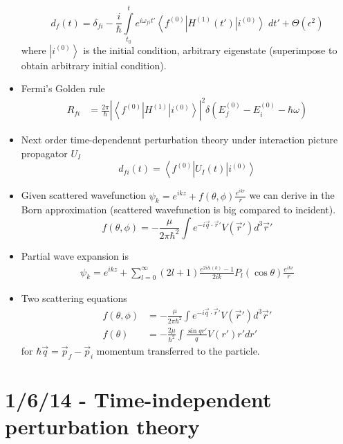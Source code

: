 \documentclass[10pt]{report}
\newcommand{\bra}[1]{\left<#1\right|}
\newcommand{\ket}[1]{\left|#1\right>}
\newcommand{\abs}[1]{\left|#1\right|}
\begin{document}
\begin{itemize}
    \begin{equation}
        d_f(t) = \delta_{fi}-\frac{i}{\hbar}\displaystyle\int\limits_{t_0}^{t}e^{i\omega_{fi}t'}\bra{f^{(0)}}H^{(1)}(t')\ket{i^{(0)}}\;dt' + \Theta(\epsilon^2)
    \end{equation}
    where $\ket{i^{(0)}}$ is the initial condition, arbitrary eigenstate (superimpose to obtain arbitrary initial condition). 
    \item Fermi's Golden rule
    \begin{align}
        R_{fi} &= \frac{2\pi}{\hbar}\abs{\bra{f^{(0)}}H^{(1)}\ket{i^{(0)}}}^2\delta\left( E_f^{(0)} - E_i^{(0)} - \hbar\omega \right)
    \end{align}
    \item Next order time-dependennt perturbation theory under interaction picture propagator $U_I$
        \begin{equation}
            d_{fi}(t) = \bra{f^{(0)}}U_I(t)\ket{i^{(0)}}
        \end{equation}
    \item Given scattered wavefunction $\psi_k = e^{ikz} + f(\theta,\phi)\frac{e^{ikr}}{r}$ we can derive in the Born approximation (scattered wavefunction is big compared to incident).
        \begin{equation}
            f(\theta,\phi) = -\frac{\mu}{2\pi\hbar^2}\int e^{-i\vec{q}\cdot \vec{r}'}V(\vec{r}')d^3\vec{r}'
        \end{equation}
    \item Partial wave expansion is
        \begin{align}
                \psi_k = e^{ikz} + \sum_{l=0}^{\infty}(2l+1)\frac{e^{2i\delta_l(k)} - 1}{2ik}P_l(\cos\theta)\frac{e^{ikr}}{r}
        \end{align}
    \item Two scattering equations
        \begin{align}
                f(\theta,\phi) &= -\frac{\mu}{2\pi\hbar^2}\int e^{-i\vec{q}\cdot \vec{r}'}V(\vec{r}')d^3\vec{r}'\\
                f(\theta)&= -\frac{2\mu}{\hbar^2}\int \frac{\sin qr'}{q}V(r') r' dr'
        \end{align}
        for $\hbar\vec{q} = \vec{p}_f - \vec{p}_i$ momentum transferred to the particle.
\end{itemize}

\chapter{1/6/14 - Time-independent perturbation theory}
\end{document}
